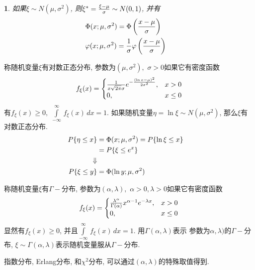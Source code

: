 \newtheorem{about_normal_distru}[theorem_root]{\lemma}
\begin{about_normal_distru}
如果\(\xi \sim N(\mu, \sigma^2)\), 则\(\xi^\ast = {\xi -\mu\over\sigma}\sim N(0,1)\), 并有
\begin{align}
&\Phi(x; \mu, \sigma^2) = \Phi\left({x - \mu\over\sigma}\right)\cr
&\varphi(x; \mu, \sigma^2) = {1\over\sigma}\varphi\left({x-\mu\over\sigma}\right)
\end{align}
\end{about_normal_distru}

\begin{logarithm_distru}[对数正态分布]
称随机变量\(\xi\)有对数正态分布, 参数为\((\mu, \sigma^2),\,\,\sigma>0\)如果它有密度函数
\begin{align}
f_{\xi}(x) = \begin{cases}{1\over x\sqrt{2\pi}\sigma}e^{-{(\ln x - \mu)^2\over 2\sigma^2}}, & x>0\cr
0, & x\le 0\end{cases}
\end{align}
有\(f_{\xi}(x)\ge 0,\,\,\int\limits_{-\infty}^{\infty}\,f_{\xi}(x)\,dx = 1\). 如果随机变量\(\eta = \ln\xi \sim N(\mu, \sigma^2)\), 那么\(\xi\)有对数正态分布.
\begin{align*}
    P\{{\eta}\le x\} &= \Phi(x; \mu, \sigma^2) = P\{\ln\xi\le x\}\cr
     &= P\{\xi\le e^x\}\cr
    \Downarrow\cr
    P\{\xi\le y\} &= \Phi(\ln y; \mu, \sigma^2)
\end{align*}
\end{logarithm_distru}

\begin{gamma_distru}
称随机变量\(\xi\)有\(\Gamma-\)分布, 参数为\((\alpha, \lambda),\,\,\alpha>0,\lambda>0\)如果它有密度函数
\begin{align}
f_{\xi}(x) = \begin{cases}{\lambda^\alpha\over\Gamma(\alpha)}x^{\alpha - 1}e^{-\lambda x}, & x>0\cr
0, & x\le 0\end{cases}
\end{align}
显然有\(f_\xi(x)\ge 0\), 并且\(\int\limits_{-\infty}^{\infty}\,f_\xi(x)\,dx = 1\). 用\(\Gamma(\alpha, \lambda)\)表示
参数为\(\alpha, \lambda)\)的\(\Gamma-\)分布, \(\xi\sim\Gamma(\alpha, \lambda)\)表示随机变量服从\(\Gamma-\)分布.
\end{gamma_distru}

指数分布, Erlang分布, 和\(\chi^2\)分布, 可以通过\((\alpha,\lambda)\)的特殊取值得到.

